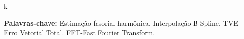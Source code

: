 \begin{resumo}

k

\textbf{Palavras-chave:} Estimação fasorial harmônica. Interpolação B-Spline. TVE-Erro Vetorial Total. FFT-Fast Fourier Transform.


\end{resumo}
